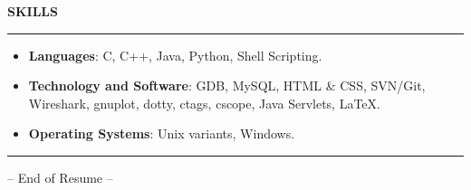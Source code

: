 \documentclass[a4paper, 10pt]{extarticle}
\begin{document}
\begin{large}
\begin{itemize}
\end{itemize}
\vspace{.1cm}
\vspace{-0.2cm}
\begin{flushleft}
{\LARGE{\textbf{S}}\Large{\textbf{KILLS}}}
\end{flushleft}

\vspace{-.2cm} \hrule \vspace{-.1cm}

\begin{itemize}
    \item{\textbf{Languages}: C, C++, Java, Python, Shell Scripting.}
    \vspace{-.1cm}
    \item{\textbf{Technology and Software}: GDB, MySQL, HTML \& CSS, SVN/Git,
Wireshark, gnuplot, dotty, ctags, cscope, Java Servlets, \LaTeX{}.}
    \vspace{-.1cm}
    \item{\textbf{Operating Systems}: Unix variants, Windows.}
\end{itemize}

 \vspace{0.6cm}\hrule \vspace{-.2cm}
 \begin{center}
 \tiny{-- End of Resume --}
\end{center}


\newpage


\end{large}
\end{document}
